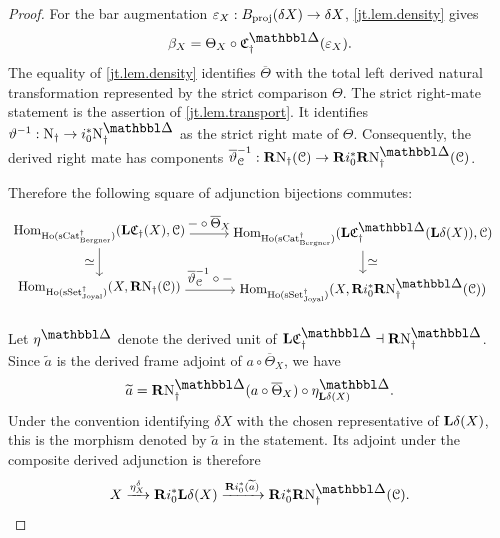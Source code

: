 \documentclass[a4paper,dvipdfmx,11pt]{amsart}
\begin{document}
\begin{proof}
  For the bar augmentation $\varepsilon_X: B_{\mathrm{proj}}(\delta X) \to \delta X$, \cref{jt.lem.density} gives
  \begin{align}
    \beta_X = \Theta_X \circ \frakC^{\prism}_{\dag}(\varepsilon_X).
  \end{align}
  The equality of \cref{jt.lem.density} identifies $\overline\Theta$ with the total left derived natural transformation represented by the strict comparison $\Theta$.
  The strict right-mate statement is the assertion of \cref{jt.lem.transport}.
  It identifies $\vartheta^{-1}:\N_{\dag}\to i_0^*\N^{\prism}_{\dag}$ as the strict right mate of $\Theta$.
  Consequently, the derived right mate has components $\overline\vartheta_{\calC}^{-1}: \bfR \N_{\dag}(\calC) \to \bfR i_0^*\bfR\N^{\prism}_{\dag}(\calC)$.

  Therefore the following square of adjunction bijections commutes:
  \begin{align}
    &\begin{tikzpicture}[auto]
        \node (rigidification-hom) at (0,1.5) {$
          \Hom_{\Ho(\sCat^{\dag}_{\Bergner})}
          (\bfL\frakC_{\dag}(X),\calC)$};
        \node (frame-rigidification-hom) at (7,1.5) {$
          \Hom_{\Ho(\sCat^{\dag}_{\Bergner})}
          (\bfL\frakC^{\prism}_{\dag}(\bfL\delta(X)),\calC)$};
        \node (nerve-hom) at (0,0) {$
          \Hom_{\Ho(\sSet^{\dag}_{\Joyal})}
          (X,\bfR \N_{\dag}(\calC))$};
        \node (frame-nerve-hom) at (7,0) {$
          \Hom_{\Ho(\sSet^{\dag}_{\Joyal})}
          (X,\bfR i_0^*\bfR\N^{\prism}_{\dag}(\calC))$};
        \draw[->]
          (rigidification-hom) --
          node[above] {$-\circ\overline\Theta_X$}
          (frame-rigidification-hom);
        \draw[->]
          (rigidification-hom) --
          node[left] {$\simeq$}
          (nerve-hom);
        \draw[->]
          (frame-rigidification-hom) --
          node[right] {$\simeq$}
          (frame-nerve-hom);
        \draw[->]
          (nerve-hom) --
          node {$\overline\vartheta_{\calC}^{-1}\circ-$}
          (frame-nerve-hom);
      \end{tikzpicture}%
  \end{align}

  Let $\eta^{\prism}$ denote the derived unit of $\bfL\frakC^{\prism}_{\dag}\dashv\bfR\N^{\prism}_{\dag}$.
  Since $\widetilde a$ is the derived frame adjoint of $a\circ\overline\Theta_X$, we have
  \begin{align}
    \widetilde a
    =
    \bfR\N^{\prism}_{\dag}
    (a\circ\overline\Theta_X)
    \circ
    \eta^{\prism}_{\bfL\delta(X)}.
  \end{align}
  Under the convention identifying $\delta X$ with the chosen representative of $\mathbf{L}\delta(X)$, this is the morphism denoted by $\widetilde a$ in the statement.
  Its adjoint under the composite derived adjunction is therefore
  \begin{align}
    X
    \xrightarrow{\eta_X^{\delta}}
    \bfR i_0^*\bfL\delta(X)
    \xrightarrow{\bfR i_0^*(\widetilde a)}
    \bfR i_0^*\bfR\N^{\prism}_{\dag}(\calC).
  \end{align}


\end{proof}
\end{document}

